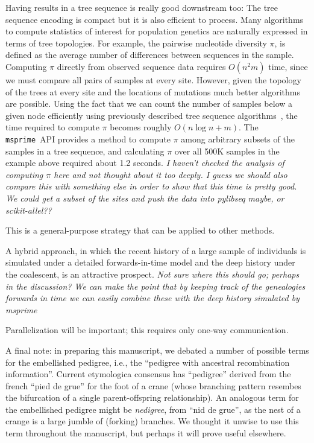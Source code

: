 \documentclass{article}
\newcommand{\msprime}{\texttt{msprime}}
\newcommand{\jk}[1]{{\em \color{red} #1}}
\begin{document}
Having results in a tree sequence is really good downstream too:
The tree sequence encoding is compact but it is also efficient to process.
Many algorithms to compute statistics of interest for population genetics
are naturally expressed in terms of tree topologies. For example, the
pairwise nucleotide diversity $\pi$, is defined as the average number of
differences between sequences in the sample. Computing $\pi$ directly
from observed sequence data requires $O(n^2 m)$ time, since we must
compare all pairs of samples at every site. However, given the topology of
the trees at every site and the locations of mutations much better algorithms
are possible. Using the fact that we can count the number of samples below
a given node efficiently using previously described tree sequence
algorithms~\citep{kelleher2016efficient}, the time required to compute $\pi$
becomes roughly $O(n \log n + m)$.
The \msprime\ API provides a method to compute $\pi$ among arbitrary subsets of the
samples in a tree sequence, and calculating $\pi$ over all 500K samples
in the example above required about 1.2 seconds.
\jk{I haven't checked the analysis of computing $\pi$ here and not thought about
it too deeply. I guess we should also compare this with something else in order to
show that this time is pretty good. We could get a subset of the sites and push
the data into pylibseq maybe, or scikit-allel??}

This is a general-purpose strategy that can be applied to other methods.

A hybrid approach, in which the recent history of a large sample of
individuals is simulated under a detailed forwards-in-time model and the deep history
under the coalescent, is an attractive prospect.
\jk{Not sure where this should go; perhaps in the discussion? We can make the point that
by keeping track of the genealogies forwards in time we can easily combine these with the
deep history simulated by msprime}

Parallelization will be important;
this requires only one-way communication.

A final note:
in preparing this manuscript, 
we debated a number of possible terms for the embellished pedigree,
i.e., the ``pedigree with ancestral recombination information''.
Current etymologica consensus \citep{liberman2014little} has
``pedigree'' derived from the french ``pied de grue'' for the foot of a crane
(whose branching pattern resembes the bifurcation of a single parent-offspring relationship).
An analogous term for the embellished pedigree might be \emph{nedigree},
from ``nid de grue'',
as the nest of a crange is a large jumble of (forking) branches.
We thought it unwise to use this term throughout the manuscript,
but perhaps it will prove useful elsewhere.
\end{document}
